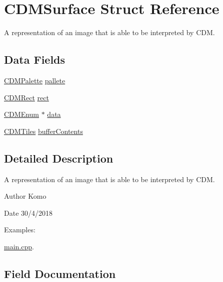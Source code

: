 \hypertarget{struct_c_d_m_surface}{}\section{C\+D\+M\+Surface Struct Reference}
\label{struct_c_d_m_surface}


A representation of an image that is able to be interpreted by C\+DM.  


\subsection*{Data Fields}
\begin{DoxyCompactItemize}
\item 
\mbox{\hyperlink{struct_c_d_m_palette}{C\+D\+M\+Palette}} \mbox{\hyperlink{struct_c_d_m_surface_a22f86f11ee9943243675467949ec8505}{pallete}}
\item 
\mbox{\hyperlink{_c_d_m_8h_a23402dc2128c3c7f1e88e505a5631b9c}{C\+D\+M\+Rect}} \mbox{\hyperlink{struct_c_d_m_surface_aa61e26c3b59930152cdaa0ce2dac8b14}{rect}}
\item 
\mbox{\hyperlink{_c_d_m_8h_a3b61dfc1ca706f8e42c76483dc93576f}{C\+D\+M\+Enum}} $\ast$ \mbox{\hyperlink{struct_c_d_m_surface_adce19b3211f4678a93f6924f7888c7e9}{data}}
\item 
\mbox{\hyperlink{struct_c_d_m_tiles}{C\+D\+M\+Tiles}} \mbox{\hyperlink{struct_c_d_m_surface_a095e3adb5378aedc48f9a15d9f2e84b9}{buffer\+Contents}}
\end{DoxyCompactItemize}


\subsection{Detailed Description}
A representation of an image that is able to be interpreted by C\+DM. 

\begin{DoxyAuthor}{Author}
Komo 
\end{DoxyAuthor}
\begin{DoxyDate}{Date}
30/4/2018 
\end{DoxyDate}
\begin{Desc}
\item[Examples\+: ]\par
\mbox{\hyperlink{main_8cpp-example}{main.\+cpp}}.\end{Desc}


\subsection{Field Documentation}
\mbox{\label{struct_c_d_m_surface_a095e3adb5378aedc48f9a15d9f2e84b9}} 
